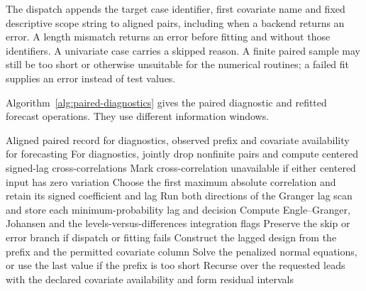 The dispatch appends the target case identifier, first covariate name and fixed descriptive scope string to aligned pairs, including when a backend returns an error. A length mismatch returns an error before fitting and without those identifiers. A univariate case carries a skipped reason. A finite paired sample may still be too short or otherwise unsuitable for the numerical routines; a failed fit supplies an error instead of test values.

Algorithm~\ref{alg:paired-diagnostics} gives the paired diagnostic
and refitted forecast operations. They use different information
windows.
\begin{algorithm}[htbp]
\caption{Compute retrospective paired diagnostics and construct the separately scored blind and covariate-aware ridge forecasts.}
\label{alg:paired-diagnostics}
\begin{algorithmic}[1]
\Require Aligned paired record for diagnostics, observed prefix and covariate availability for forecasting
\State For diagnostics, jointly drop nonfinite pairs and compute centered signed-lag cross-correlations
\State Mark cross-correlation unavailable if either centered input has zero variation
\State Choose the first maximum absolute correlation and retain its signed coefficient and lag
\State Run both directions of the Granger lag scan and store each minimum-probability lag and decision
\State Compute Engle--Granger, Johansen and the levels-versus-differences integration flags
\State Preserve the skip or error branch if dispatch or fitting fails
  \State Construct the lagged design from the prefix and the permitted covariate column
  \State Solve the penalized normal equations, or use the last value if the prefix is too short
  \State Recurse over the requested leads with the declared covariate availability and form residual intervals
\EndFor
\end{algorithmic}
\end{algorithm}


